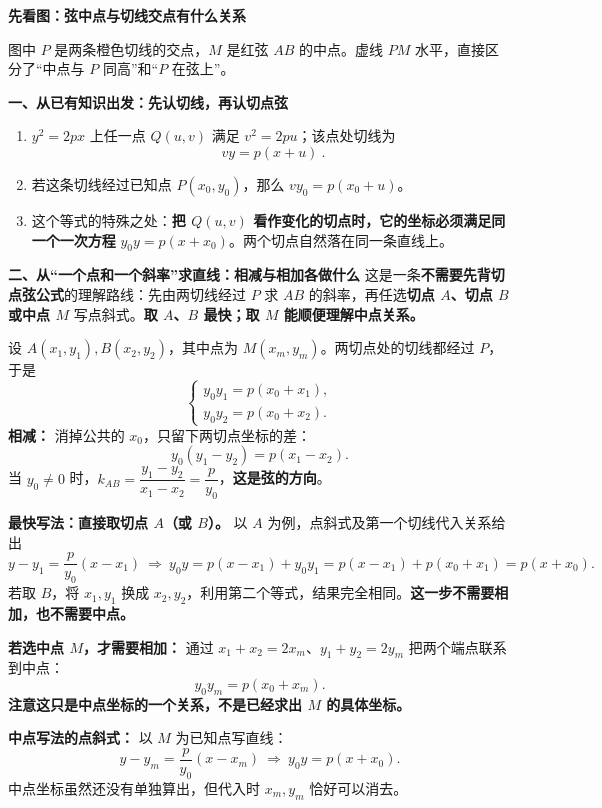\begin{explanationbox}
\textbf{\textcolor{CExplanation}{先看图：弦中点与切线交点有什么关系}}
\begin{center}\end{center}
图中 $P$ 是两条橙色切线的交点，$M$ 是红弦 $AB$ 的中点。虚线 $PM$ 水平，直接区分了“中点与 $P$ 同高”和“$P$ 在弦上”。

\textbf{\textcolor{CExplanation}{一、从已有知识出发：先认切线，再认切点弦}}
\begin{enumerate}[leftmargin=*,itemsep=0.4em]
\item $y^2=2px$ 上任一点 $Q(u,v)$ 满足 $v^2=2pu$；该点处切线为
\[\boxed{\ vy=p(x+u)\ }.\]
\item 若这条切线经过已知点 $P(x_0,y_0)$，那么 $vy_0=p(x_0+u)$。
\item 这个等式的特殊之处：\textbf{把 $Q(u,v)$ 看作变化的切点时，它的坐标必须满足同一个一次方程} $y_0y=p(x+x_0)$。两个切点自然落在同一条直线上。
\end{enumerate}


\medskip
\textbf{\textcolor{CExplanation}{二、从“一个点和一个斜率”求直线：相减与相加各做什么}}
这是一条\textbf{不需要先背切点弦公式}的理解路线：先由两切线经过 $P$ 求 $AB$ 的斜率，再任选\textbf{切点 $A$、切点 $B$ 或中点 $M$} 写点斜式。\textbf{取 $A$、$B$ 最快；取 $M$ 能顺便理解中点关系。}

设 $A(x_1,y_1),B(x_2,y_2)$，其中点为 $M(x_m,y_m)$。两切点处的切线都经过 $P$，于是
\[
 \begin{cases}
 y_0y_1=p(x_0+x_1),\\
 y_0y_2=p(x_0+x_2).
 \end{cases}
\]
\textbf{相减：} 消掉公共的 $x_0$，只留下两切点坐标的差：
\[
 y_0(y_1-y_2)=p(x_1-x_2).
\]
当 $y_0\ne0$ 时，\(k_{AB}=\dfrac{y_1-y_2}{x_1-x_2}=\dfrac p{y_0}\)，\textbf{这是弦的方向}。

\textbf{最快写法：直接取切点 $A$（或 $B$）。} 以 $A$ 为例，点斜式及第一个切线代入关系给出
\[
 y-y_1=\frac p{y_0}(x-x_1)
 \ \Longrightarrow\ y_0y=p(x-x_1)+y_0y_1
 =p(x-x_1)+p(x_0+x_1)=p(x+x_0).
\]
若取 $B$，将 $x_1,y_1$ 换成 $x_2,y_2$，利用第二个等式，结果完全相同。\textbf{这一步不需要相加，也不需要中点。}

\textbf{若选中点 $M$，才需要相加：} 通过 $x_1+x_2=2x_m$、$y_1+y_2=2y_m$ 把两个端点联系到中点：
\[
 y_0y_m=p(x_0+x_m).
\]
\textbf{注意这只是中点坐标的一个关系，不是已经求出 $M$ 的具体坐标。}

\textbf{中点写法的点斜式：} 以 $M$ 为已知点写直线：
\[
 y-y_m=\frac p{y_0}(x-x_m)
 \ \Longrightarrow\ y_0y=p(x+x_0).
\]
中点坐标虽然还没有单独算出，但代入时 $x_m,y_m$ 恰好可以消去。


\end{explanationbox}
